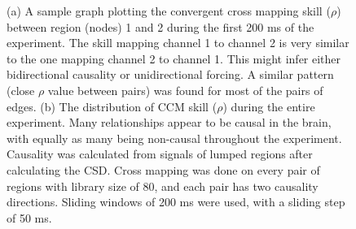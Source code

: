 \documentclass[journal,12pt,onecolumn,draftclsnofoot]{IEEEtran}  %
\begin{document}
\begin{figure}[H]
\begin{subfigure}{0.45\textwidth}
    \caption{}
    \label{fig:rho_hist_all_experiment}
  \end{subfigure}
  \caption{(a) A sample graph plotting the convergent cross mapping skill ($\rho$) between region (nodes) 1 and 2 during the first 200 ms of the experiment. The skill mapping channel 1 to channel 2 is very similar to the one mapping channel 2 to channel 1. This might infer either bidirectional causality or unidirectional forcing. A similar pattern (close $\rho$ value between pairs) was found for most of the pairs of edges. (b) The distribution of CCM skill ($\rho$) during the entire experiment. Many relationships appear to be causal in the brain, with equally as many being non-causal throughout the experiment. Causality was calculated from signals of lumped regions after calculating the CSD. Cross mapping was done on every pair of regions with library size of 80, and each pair has two causality directions. Sliding windows of 200 ms were used, with a sliding step of 50 ms.}
\end{figure}
\end{document}
